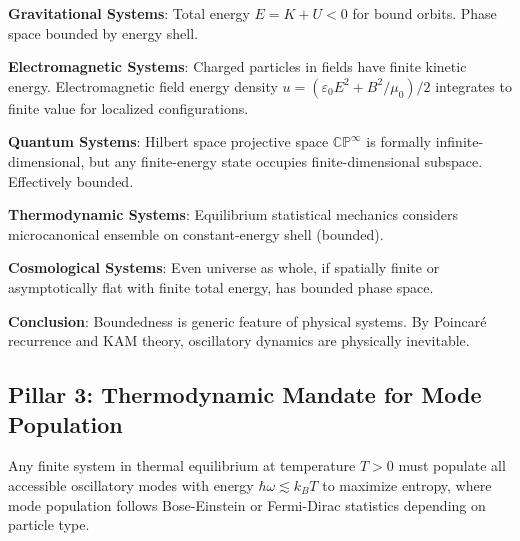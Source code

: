 \documentclass[11pt,onecolumn]{article}
\begin{document}
\textbf{Gravitational Systems}: Total energy $E = K + U < 0$ for bound orbits. Phase space bounded by energy shell.

\textbf{Electromagnetic Systems}: Charged particles in fields have finite kinetic energy. Electromagnetic field energy density $u = (\varepsilon_0 E^2 + B^2/\mu_0)/2$ integrates to finite value for localized configurations.

\textbf{Quantum Systems}: Hilbert space projective space $\mathbb{CP}^{\infty}$ is formally infinite-dimensional, but any finite-energy state occupies finite-dimensional subspace. Effectively bounded.

\textbf{Thermodynamic Systems}: Equilibrium statistical mechanics considers microcanonical ensemble on constant-energy shell (bounded).

\textbf{Cosmological Systems}: Even universe as whole, if spatially finite or asymptotically flat with finite total energy, has bounded phase space.

\textbf{Conclusion}: Boundedness is generic feature of physical systems. By Poincar\'e recurrence and KAM theory, oscillatory dynamics are physically inevitable.

\subsection{Pillar 3: Thermodynamic Mandate for Mode Population}

\begin{theorem}
\label{thm:mode_completeness}
Any finite system in thermal equilibrium at temperature $T > 0$ must populate all accessible oscillatory modes with energy $\hbar \omega \lesssim k_B T$ to maximize entropy, where mode population follows Bose-Einstein or Fermi-Dirac statistics depending on particle type.
\end{theorem}
\end{document}
